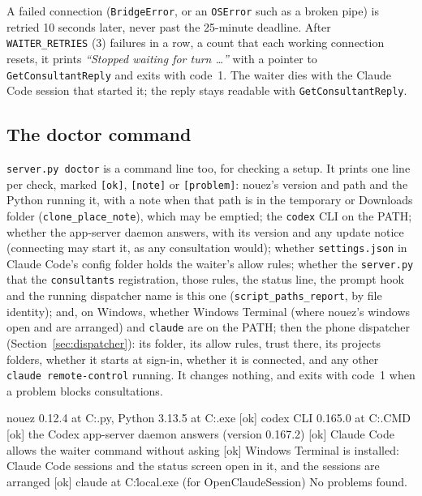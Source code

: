 \documentclass[10pt,a4paper]{article}
\newcommand{\code}[1]{\texttt{#1}}
\begin{document}
A failed connection (\code{BridgeError}, or an \code{OSError} such as a broken pipe) is retried
10 seconds later, never past the 25-minute deadline. After \code{WAITER\_RETRIES} (3) failures in a
row, a count that each working connection resets, it prints \emph{``Stopped waiting for turn
\ldots''} with a pointer to \code{GetConsultantReply} and exits with code~1. The waiter dies with
the Claude Code session that started it; the reply stays readable with \code{GetConsultantReply}.

\subsection{The doctor command}

\code{server.py doctor} is a command line too, for checking a setup. It prints one line per check,
marked \code{[ok]}, \code{[note]} or \code{[problem]}: nouez's version and path and the Python
running it, with a note when that path is in the temporary or Downloads folder
(\code{clone\_place\_note}), which may be emptied; the \code{codex} CLI on the PATH; whether the app-server daemon answers, with its
version and any update notice (connecting may start it, as any consultation would); whether
\code{settings.json} in Claude Code's config folder holds the waiter's allow rules; whether the
\code{server.py} that the \code{consultants} registration, those rules, the status line, the prompt hook
and the running dispatcher name is this one (\code{script\_paths\_report}, by file identity); and, on
Windows, whether Windows Terminal (where nouez's windows open and are arranged) and \code{claude} are on the PATH; then the phone dispatcher
(Section~\ref{sec:dispatcher}): its folder, its allow rules, trust there, its projects folders, whether it starts at
sign-in, whether it is connected, and any other \code{claude remote-control} running. It changes
nothing, and exits with code~1 when a problem blocks consultations.
\begin{plain}[Output]
[ok] nouez 0.12.4 at C:\Users\you\nouez\server.py, Python 3.13.5 at C:\python.exe
[ok] codex CLI 0.165.0 at C:\Users\you\AppData\Roaming\npm\codex.CMD
[ok] the Codex app-server daemon answers (version 0.167.2)
[ok] Claude Code allows the waiter command without asking
[ok] Windows Terminal is installed: Claude Code sessions and the status screen open in it, and the sessions are arranged
[ok] claude at C:\Users\you\.local\bin\claude.exe (for OpenClaudeSession)
No problems found.
\end{plain}
\end{document}

